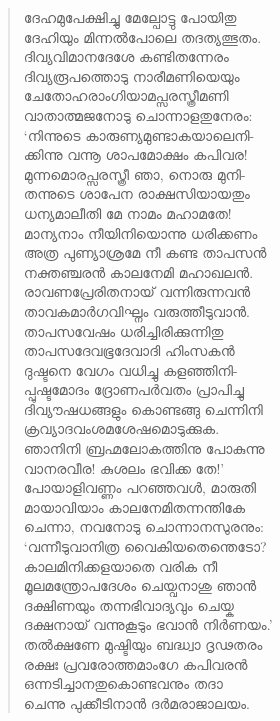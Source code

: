 \begin{verse}
ദേഹമുപേക്ഷിച്ചു മേല്പോട്ടു പോയിതു\\
ദേഹിയും മിന്നല്‍പോലെ തദത്യത്ഭുതം.\\
ദിവ്യവിമാനദേശേ കണ്ടിതന്നേരം\\
ദിവ്യരൂപത്തൊടു നാരീമണിയെയും\\
ചേതോഹരാംഗിയാമപ്സരസ്ത്രീമണി\\
വാതാത്മജനോടു ചൊന്നാളതുനേരം:\\
‘നിന്നുടെ കാരുണ്യമുണ്ടാകയാലെനി-\\
ക്കിന്നു വന്നൂ ശാപമോക്ഷം കപിവര!\\
മുന്നമൊരപ്സരസ്ത്രീ ഞാ, നൊരു മുനി-\\
തന്നുടെ ശാപേന രാക്ഷസിയായതും\\
ധന്യമാലീതി മേ നാമം മഹാമതേ!\\
മാന്യനാം നീയിനിയൊന്നു ധരിക്കണം\\
അത്ര പുണ്യാശ്രമേ നീ കണ്ട താപസന്‍\\
നക്തഞ്ചരന്‍ കാലനേമി മഹാഖലന്‍.\\
രാവണപ്രേരിതനായ് വന്നിരുന്നവന്‍\\
താവകമാര്‍ഗവിഘ്നം വരുത്തീടുവാന്‍.\\
താപസവേഷം ധരിച്ചിരിക്കുന്നിതു\\
താപസദേവഭൂദേവാദി ഹിംസകന്‍\\
ദുഷ്ടനെ വേഗം വധിച്ചു കളഞ്ഞിനി-\\
പ്പുഷ്ടമോദം ദ്രോണപര്‍വതം പ്രാപിച്ചു\\
ദിവ്യൗഷധങ്ങളും കൊണ്ടങ്ങു ചെന്നിനി\\
ക്രവ്യാദവംശമശേഷമൊടുക്കുക.\\
ഞാനിനി ബ്രഹ്മലോകത്തിനു പോകുന്നു\\
വാനരവീര! കുശലം ഭവിക്ക തേ!’\\
പോയാളിവണ്ണം പറഞ്ഞവള്‍, മാരുതി\\
മായാവിയാം കാലനേമിതന്നന്തികേ\\
ചെന്നാ, നവനോടു ചൊന്നാനസുരനും:\\
‘വന്നീടുവാനിത്ര വൈകിയതെന്തെടോ?\\
കാലമിനിക്കളയാതെ വരിക നീ\\
മൂലമന്ത്രോപദേശം ചെയ്വനാശു ഞാന്‍\\
ദക്ഷിണയും തന്നഭിവാദ്യവും ചെയ്ക\\
ദക്ഷനായ് വന്നുകൂടും ഭവാന്‍ നിര്‍ണയം.’\\
തല്‍ക്ഷണേ മുഷ്ടിയും ബദ്ധ്വാ ദൃഢതരം\\
രക്ഷഃ പ്രവരോത്തമാംഗേ കപിവരന്‍\\
ഒന്നടിച്ചാനതുകൊണ്ടവനും തദാ\\
ചെന്നു പുക്കീടിനാന്‍ ദര്‍മരാജാലയം.
\end{verse}

